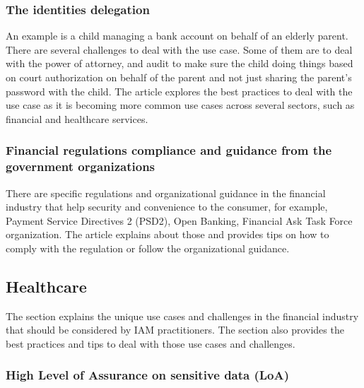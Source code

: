 \hypertarget{the-identities-delegation}{%
\subsubsection{The identities delegation}\label{the-identities-delegation}}

An example is a child managing a bank account on behalf of an elderly
parent. There are several challenges to deal with the use case. Some of
them are to deal with the power of attorney, and audit to make sure the
child doing things based on court authorization on behalf of the parent
and not just sharing the parent's password with the child. The article
explores the best practices to deal with the use case as it is becoming
more common use cases across several sectors, such as financial and
healthcare services.

\hypertarget{financial-regulations-compliance-and-guidance-from-the-government-organizations}{%
\subsubsection{Financial regulations compliance and guidance from the
government
organizations}\label{financial-regulations-compliance-and-guidance-from-the-government-organizations}}

There are specific regulations and organizational guidance in the
financial industry that help security and convenience to the consumer,
for example, Payment Service Directives 2 (PSD2), Open Banking,
Financial Ask Task Force organization. The article explains about those
and provides tips on how to comply with the regulation or follow the
organizational guidance.

\hypertarget{healthcare}{%
\subsection{Healthcare}\label{healthcare}}

The section explains the unique use cases and challenges in the
financial industry that should be considered by IAM practitioners. The
section also provides the best practices and tips to deal with those use
cases and challenges.

\hypertarget{high-level-of-assurance-on-sensitive-data-loa}{%
\subsubsection{High Level of Assurance on sensitive data
(LoA)}\label{high-level-of-assurance-on-sensitive-data-loa}}

